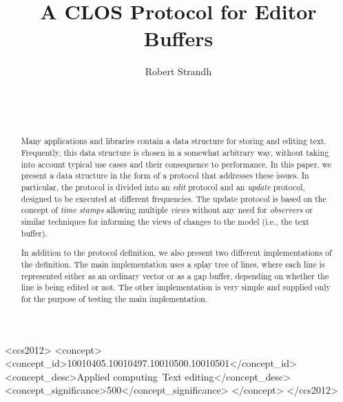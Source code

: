\documentclass{sig-alternate-05-2015}
\def\inputtex#1{}
\begin{document}
\title{A CLOS Protocol for Editor Buffers}
\author{\alignauthor
Robert Strandh\\
\\
\\
\\
}

\maketitle

\begin{abstract}
Many applications and libraries contain a data structure for storing
and editing text.  Frequently, this data structure is chosen in a
somewhat arbitrary way, without taking into account typical use cases
and their consequence to performance.  In this paper, we present a
data structure in the form of a \clos{} protocol that addresses these
issues.  In particular, the protocol is divided into an \emph{edit}
protocol and an \emph{update} protocol, designed to be executed at
different frequencies.  The update protocol is based on the concept of
\emph{time stamps} allowing multiple \emph{views} without any need for
\emph{observers} or similar techniques for informing the views of
changes to the model (i.e., the text buffer).

In addition to the protocol definition, we also present two different
implementations of the definition.  The main implementation uses a
splay tree of lines, where each line is represented either as an
ordinary vector or as a gap buffer, depending on whether the line is
being edited or not.  The other implementation is very simple and
supplied only for the purpose of testing the main implementation.
\end{abstract}

\begin{CCSXML}
  <ccs2012>
  <concept>
  <concept_id>10010405.10010497.10010500.10010501</concept_id>
  <concept_desc>Applied computing~Text editing</concept_desc>
  <concept_significance>500</concept_significance>
  </concept>
  </ccs2012>
\end{CCSXML}


\printccsdesc


\inputtex{spec-macros.tex}

\inputtex{sec-introduction.tex}
\inputtex{sec-previous.tex}
\inputtex{sec-our-method.tex}
\inputtex{sec-benefits.tex}
\inputtex{sec-conclusions.tex}
\inputtex{sec-acknowledgments.tex}
\inputtex{app-protocol.tex}



\end{document}
